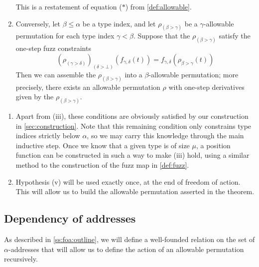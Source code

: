 \begin{enumerate}
    This is a restatement of equation (\( \ast \)) from \cref{def:allowable}.
    \item Conversely, let \( \beta \leq \alpha \) be a type index, and let \( \rho_{(\beta > \gamma)} \) be a \( \gamma \)-allowable permutation for each type index \( \gamma < \beta \).
    Suppose that the \( \rho_{(\beta > \gamma)} \) satisfy the one-step fuzz constraints
    \[ (\rho_{(\gamma >\delta)})_{(\delta > \bot)}(f_{\gamma,\delta}(t)) = f_{\gamma,\delta}(\rho_{\beta > \gamma}(t)) \]
    Then we can assemble the \( \rho_{(\beta > \gamma)} \) into a \( \beta \)-allowable permutation; more precisely, there exists an allowable permutation \( \rho \) with one-step derivatives given by the \( \rho_{(\beta > \gamma)} \).
\end{enumerate}

\begin{remarks}
    \begin{enumerate}
        \item Apart from (iii), these conditions are obviously satisfied by our construction in \cref{sec:construction}.
        Note that this remaining condition only constrains type indices strictly below \( \alpha \), so we may carry this knowledge through the main inductive step.
        Once we know that a given type is of size \( \mu \), a position function can be constructed in such a way to make (iii) hold, using a similar method to the construction of the fuzz map in \cref{def:fuzz}.
        \item Hypothesis (v) will be used exactly once, at the end of freedom of action.
        This will allow us to build the allowable permutation asserted in the theorem.
    \end{enumerate}
\end{remarks}

\subsection{Dependency of addresses}

As described in \cref{ss:foa:outline}, we will define a well-founded relation on the set of \( \alpha \)-addresses that will allow us to define the action of an allowable permutation recursively.

